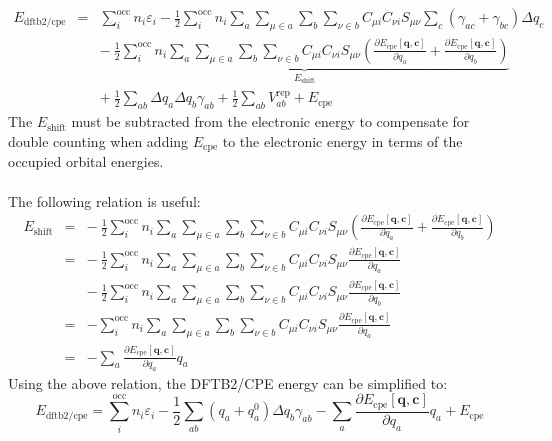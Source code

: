 \documentclass{article}
\numberwithin{equation}{section}
\begin{document}
\begin{eqnarray}
    E_\mathrm{{dftb2/cpe}}
    &=& \sum_i^\mathrm{occ} n_i \varepsilon_i 
    - \frac{1}{2} \sum_i^\mathrm{occ} n_i \sum_a \sum_{\mu \in a} \sum_b \sum_{\nu \in b}  C_{\mu i} C_{\nu i} S_{\mu\nu} \sum_c \left( \gamma_{ac} + \gamma_{bc} \right)\Delta q_c \nonumber\\
    && \underbrace{- \ \frac{1}{2} \sum_i^\mathrm{occ} n_i \sum_a \sum_{\mu \in a} \sum_b \sum_{\nu \in b}  C_{\mu i} C_{\nu i} S_{\mu\nu} \left(
    \frac{\partial E_{\mathrm{cpe}}\left[\mathbf{q}, \mathbf{c}\right]}{\partial q_a} +
    \frac{\partial E_{\mathrm{cpe}}\left[\mathbf{q}, \mathbf{c}\right]}{\partial q_b} \right)}_{E_\mathrm{shift}} \nonumber\\
    && +\ \frac{1}{2} \sum_{ab} \Delta q_a \Delta q_b \gamma_{ab}
    + \frac{1}{2} \sum_{ab} V^\mathrm{rep}_{ab} + E_{\mathrm{cpe}}
\end{eqnarray}
The $E_\mathrm{shift}$ must be subtracted from the electronic energy to compensate for double counting when adding $E_\mathrm{cpe}$ to the electronic energy in terms of the occupied orbital energies.
\\\\The following relation is useful:
\begin{eqnarray}
    E_\mathrm{shift}
    &=& - \ \frac{1}{2} \sum_i^\mathrm{occ} n_i \sum_a \sum_{\mu \in a} \sum_b \sum_{\nu \in b}  C_{\mu i} C_{\nu i} S_{\mu\nu} \left(
    \frac{\partial E_{\mathrm{cpe}}\left[\mathbf{q}, \mathbf{c}\right]}{\partial q_a} +
    \frac{\partial E_{\mathrm{cpe}}\left[\mathbf{q}, \mathbf{c}\right]}{\partial q_b} \right) \nonumber\\
    &=& - \ \frac{1}{2} \sum_i^\mathrm{occ} n_i \sum_a \sum_{\mu \in a} \sum_b \sum_{\nu \in b}  C_{\mu i} C_{\nu i} S_{\mu\nu}
    \frac{\partial E_{\mathrm{cpe}}\left[\mathbf{q}, \mathbf{c}\right]}{\partial q_a} \nonumber\\
    && - \ \frac{1}{2} \sum_i^\mathrm{occ} n_i \sum_a \sum_{\mu \in a} \sum_b \sum_{\nu \in b}  C_{\mu i} C_{\nu i} S_{\mu\nu}
    \frac{\partial E_{\mathrm{cpe}}\left[\mathbf{q}, \mathbf{c}\right]}{\partial q_b} \nonumber\\
    &=& - \sum_i^\mathrm{occ} n_i \sum_a \sum_{\mu \in a} \sum_b \sum_{\nu \in b}  C_{\mu i} C_{\nu i} S_{\mu\nu}
    \frac{\partial E_{\mathrm{cpe}}\left[\mathbf{q}, \mathbf{c}\right]}{\partial q_a} \nonumber\\
    &=& -  \sum_a  \frac{\partial E_{\mathrm{cpe}}\left[\mathbf{q}, \mathbf{c}\right]}{\partial q_a} q_a
\end{eqnarray}
Using the above relation, the DFTB2/CPE energy can be simplified to:
\begin{equation}
    E_\mathrm{{dftb2/cpe}} = \sum_i^\mathrm{occ} n_i \varepsilon_i - \frac{1}{2}\sum_{ab} \left(q_a + q_a^0 \right)\Delta q_b \gamma_{ab}
    - \sum_a  \frac{\partial E_{\mathrm{cpe}}\left[\mathbf{q}, \mathbf{c}\right]}{\partial q_a} q_a + E_{\mathrm{cpe}}
\end{equation}
\end{document}
